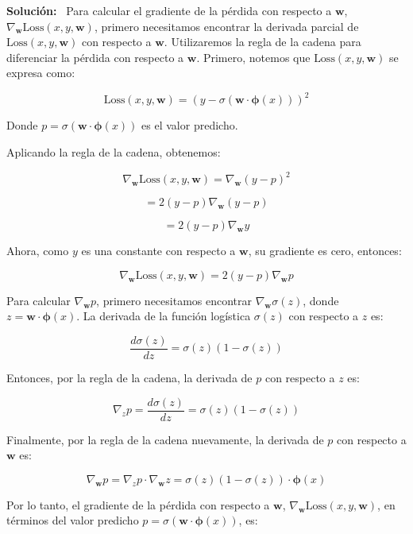 \documentclass[11pt,letterpaper]{article}
\newenvironment{solution}{%
  \noindent\begin{shaded}
  \textbf{Solución:}\ }{
  \end{shaded}%
}
\begin{document}
\begin{enumerate}
  \begin{solution}
Para calcular el gradiente de la pérdida con respecto a \( \mathbf{w} \), \( \nabla_{\mathbf{w}} \text{Loss}(x, y, \mathbf{w}) \), primero necesitamos encontrar la derivada parcial de \( \text{Loss}(x, y, \mathbf{w}) \) con respecto a \( \mathbf{w} \). Utilizaremos la regla de la cadena para diferenciar la pérdida con respecto a \( \mathbf{w} \). Primero, notemos que \( \text{Loss}(x, y, \mathbf{w}) \) se expresa como:

\[
\text{Loss}(x, y, \mathbf{w}) = (y - \sigma(\mathbf{w} \cdot \boldsymbol{\phi}(x)))^2
\]

Donde \( p = \sigma(\mathbf{w} \cdot \boldsymbol{\phi}(x)) \) es el valor predicho.

Aplicando la regla de la cadena, obtenemos:

\[
\nabla_{\mathbf{w}} \text{Loss}(x, y, \mathbf{w}) = \nabla_{\mathbf{w}} (y - p)^2
\]

\[
= 2(y - p) \nabla_{\mathbf{w}} (y - p)
\]

\[
= 2(y - p) \nabla_{\mathbf{w}} y
\]

Ahora, como \( y \) es una constante con respecto a \( \mathbf{w} \), su gradiente es cero, entonces:

\[
\nabla_{\mathbf{w}} \text{Loss}(x, y, \mathbf{w}) = 2(y - p) \nabla_{\mathbf{w}} p
\]

Para calcular \( \nabla_{\mathbf{w}} p \), primero necesitamos encontrar \( \nabla_{\mathbf{w}} \sigma(z) \), donde \( z = \mathbf{w} \cdot \boldsymbol{\phi}(x) \). La derivada de la función logística \( \sigma(z) \) con respecto a \( z \) es:

\[
\frac{d\sigma(z)}{dz} = \sigma(z)(1 - \sigma(z))
\]

Entonces, por la regla de la cadena, la derivada de \( p \) con respecto a \( z \) es:

\[
\nabla_{z} p = \frac{d\sigma(z)}{dz} = \sigma(z)(1 - \sigma(z))
\]

Finalmente, por la regla de la cadena nuevamente, la derivada de \( p \) con respecto a \( \mathbf{w} \) es:

\[
\nabla_{\mathbf{w}} p = \nabla_{z} p \cdot \nabla_{\mathbf{w}} z = \sigma(z)(1 - \sigma(z)) \cdot \boldsymbol{\phi}(x)
\]

Por lo tanto, el gradiente de la pérdida con respecto a \( \mathbf{w} \), \( \nabla_{\mathbf{w}} \text{Loss}(x, y, \mathbf{w}) \), en términos del valor predicho \( p = \sigma(\mathbf{w} \cdot \boldsymbol{\phi}(x)) \), es:


\end{solution}
\end{enumerate}
\end{document}
